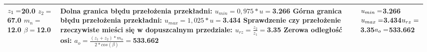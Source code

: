 \documentclass{article}%
\begin{document}
\begin{longtable}{|p{3cm}|p{7cm}|p{3cm}|}
$ \newline \newline \newline  z_ 1 = $20.0 \newline  \newline $z_2 = $67.0 \newline  \newline $m_n = $12.0 \newline  \newline $\beta = $12.0&Dolna granica błędu przełożenia przekładni: \newline $u_{min} = 0,975 * u = $3.266  \newline \newline Górna granica błędu przełożenia przekładni: \newline $u_{max} = 1,025 * u = $3.434  \newline \newline Sprawdzenie czy przełożenie rzeczywiste mieści się w dopuszcalnym przedziale: \newline $u_{rz} = \frac{z_2}{z_1} = $3.35  \newline \newline Zerowa odległość osi: \newline $a_o = \frac{(z_1 + z_2) * m_n}{2 * cos(\beta)} = $533.662&$ \newline u_{min} = $3.266$ \newline  \newline u_{max} = $3.434$ \newline  \newline  \newline u_{rz} = $3.35$ \newline  \newline a_o = $533.662\\%
\hline%

\end{longtable}
\end{document}
